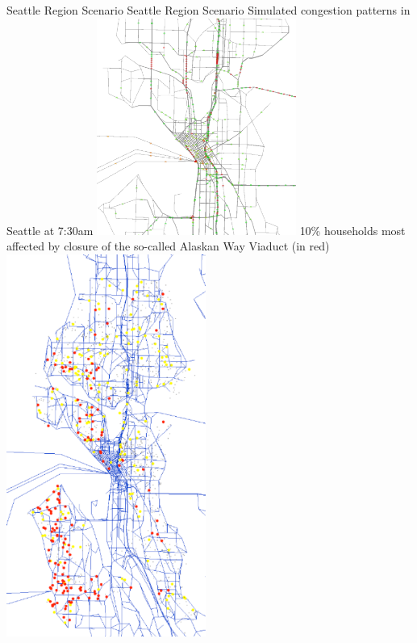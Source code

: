 \createfigure%
{Seattle Region Scenario}%
{Seattle Region Scenario}%
{\label{fig:seattle-snapshot}}%
{%
  \createsubfigure%
  {Simulated congestion patterns in Seattle at 7:30am}%
  {\includegraphics[width=0.49\textwidth,angle=0]{using/figures/seattle-snapshot-7h30.pdf}}%
  {\label{fig:seattle-snapshot.left}}%
  {}%
  \createsubfigure%
  {10\% households most affected by closure of the so-called Alaskan Way Viaduct (in red)}%
	{\includegraphics[width=0.49\textwidth,angle=0]{using/figures/seattle-top-10pct-0it.pdf}}%
  {\label{fig:seattle-snapshot.right}}%
  {}%
}%
{}

%



